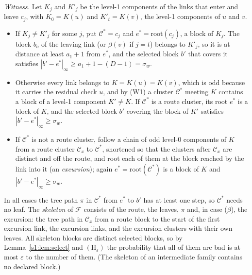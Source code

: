 \documentclass[11pt]{amsart}
\theoremstyle{definition}
\theoremstyle{remark}
\numberwithin{equation}{section}
\newcommand{\cF}{\mathcal{F}}
\newcommand{\eps}{\varepsilon}
\begin{document}
\emph{Witness.} Let $K_j$ and $K'_j$ be the level-1 components of the links that enter and leave $c_j$, with $K_0=K(u)$ and $K'_t=K(v)$, the level-1 components of $u$ and $v$.
\begin{itemize}[leftmargin=2em]
\item[($\alpha$)] If $K_j\ne K'_j$ for some $j$, put $\mathcal C^*=c_j$ and $e^*=\mathrm{root}(c_j)$, a block of $K_j$. The block $b_o$ of the leaving link (or $\beta(v)$ if $j=t$) belongs to $K'_j$, so it is at distance at least $a_1+1$ from $e^*$, and the selected block $b'$ that covers it satisfies $|b'-e^*|_\infty\ge a_1+1-(D-1)=\sigma_w$.
\item[($\alpha'$)] Otherwise every link belongs to $K=K(u)=K(v)$, which is odd because it carries the residual check $u$, and by (W1) a cluster $\mathcal C^*$ meeting $K$ contains a block of a level-1 component $K'\ne K$. If $\mathcal C^*$ is a route cluster, its root $e^*$ is a block of $K$, and the selected block $b'$ covering the block of $K'$ satisfies $|b'-e^*|_\infty\ge\sigma_w$.
\item[($\beta$)] If $\mathcal C^*$ is not a route cluster, follow a chain of odd level-0 components of $K$ from a route cluster $\mathcal C_x$ to $\mathcal C^*$, shortened so that the clusters after $\mathcal C_x$ are distinct and off the route, and root each of them at the block reached by the link into it (an \emph{excursion}); again $e^*=\mathrm{root}(\mathcal C^*)$ is a block of $K$ and $|b'-e^*|_\infty\ge\sigma_w$.
\end{itemize}
In all cases the tree path $\pi$ in $\mathcal C^*$ from $e^*$ to $b'$ has at least one step, so $\mathcal C^*$ needs no leaf. The \emph{skeleton} of $\cF$ consists of the route, the leaves, $\pi$ and, in case ($\beta$), the excursion: the tree path in $\mathcal C_x$ from a route block to the start of the first excursion link, the excursion links, and the excursion clusters with their own leaves. All skeleton blocks are distinct selected blocks, so by Lemma~\ref{s1:lem:select} and $(\mathrm H_\eps)$ the probability that all of them are bad is at most $\eps$ to the number of them. (The skeleton of an intermediate family contains no declared block.)
\end{document}

